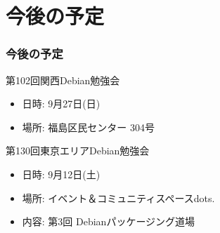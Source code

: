 \documentclass[cjk,dvipdfmx,10pt,compress,%
hyperref={bookmarks=true,bookmarksnumbered=true,bookmarksopen=false,%
colorlinks=false,%
pdftitle={第 101 回 関西 Debian 勉強会},%
pdfauthor={倉敷・のがた・佐々木・かわだ},%
pdfsubject={資料},%
}]{beamer}
\begin{document}
\section{今後の予定}
\begin{frame}[fragile]
\frametitle{今後の予定}

\begin{block}{第102回関西Debian勉強会}
  \begin{itemize}
  \item 日時: 9月27日(日)
  \item 場所: 福島区民センター 304号
  \end{itemize}
\end{block}

\begin{block}{第130回東京エリアDebian勉強会}
  \begin{itemize}
  \item 日時: 9月12日(土)
  \item 場所: イベント＆コミュニティスペースdots.
  \item 内容: 第3回 Debianパッケージング道場
  \end{itemize}
\end{block}

\end{frame}

\takahashi[50]{  }
\end{document}

